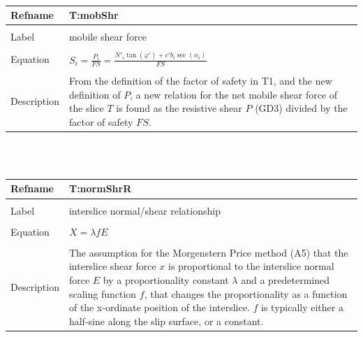 \documentclass[12pt]{article}
\begin{document}
~\newline
\noindent \begin{minipage}{\textwidth}
\begin{tabular}{p{} p{}}
\toprule \textbf{Refname} & \textbf{T:mobShr}
\label{T:mobShr}
\\ \midrule \\
Label & mobile shear force
\\ \midrule \\
Equation & $S_{i}=\frac{P_{i}}{FS}=\frac{{N'}_{i}\tan\left(\varphi{}'\right)+c'b_{i}\sec\left(\alpha{}_{i}\right)}{FS}$
\\ \midrule \\
Description & From the definition of the factor of safety in T1, and the new definition of $P$, a new relation for the net mobile shear force of the slice $T$ is found as the resistive shear $P$ (GD3) divided by the factor of safety $FS$.
\\ \bottomrule \end{tabular}
\end{minipage}\\
~\newline
\noindent \begin{minipage}{\textwidth}
\begin{tabular}{p{} p{}}
\toprule \textbf{Refname} & \textbf{T:normShrR}
\label{T:normShrR}
\\ \midrule \\
Label & interslice normal/shear relationship
\\ \midrule \\
Equation & $X=\lambda{}fE$
\\ \midrule \\
Description & The assumption for the Morgenstern Price method (A5) that the interslice shear force $x$ is proportional to the interslice normal force $E$ by a proportionality constant $\lambda{}$ and a predetermined scaling function $f$, that changes the proportionality as a function of the x-ordinate position of the interslice. $f$ is typically either a half-sine along the slip surface, or a constant.
\\ \bottomrule \end{tabular}
\end{minipage}\\
~\newline
\end{document}
